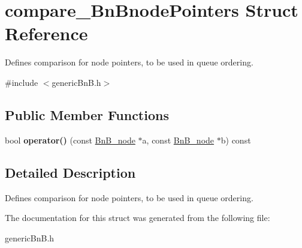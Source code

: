 \hypertarget{structcompare___bn_bnode_pointers}{}\section{compare\+\_\+\+Bn\+Bnode\+Pointers Struct Reference}
\label{structcompare___bn_bnode_pointers}


Defines comparison for node pointers, to be used in queue ordering.  




{\ttfamily \#include $<$generic\+Bn\+B.\+h$>$}

\subsection*{Public Member Functions}
\begin{DoxyCompactItemize}
\item 
\hypertarget{structcompare___bn_bnode_pointers_a4e24aca88d05a09bc169579f5ed67767}{}bool {\bfseries operator()} (const \hyperlink{class_bn_b__node}{Bn\+B\+\_\+node} $\ast$a, const \hyperlink{class_bn_b__node}{Bn\+B\+\_\+node} $\ast$b) const \label{structcompare___bn_bnode_pointers_a4e24aca88d05a09bc169579f5ed67767}

\end{DoxyCompactItemize}


\subsection{Detailed Description}
Defines comparison for node pointers, to be used in queue ordering. 

The documentation for this struct was generated from the following file\+:\begin{DoxyCompactItemize}
\item 
generic\+Bn\+B.\+h\end{DoxyCompactItemize}
